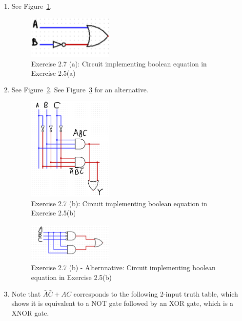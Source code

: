 \documentclass[12pt]{article}
\newenvironment{sol}[1][Solution]{\begin{trivlist}
		\item[\hskip \labelsep {\bfseries #1:}]}{\end{trivlist}}
\begin{document}
\begin{sol}
	\begin{enumerate}[label=(\alph*)]
		\item See Figure~\ref{02-07a}.
		\begin{figure}
			\centering
			\includegraphics[width=0.4\textwidth]{02-07a-circuit}
			\caption{Exercise 2.7 (a): Circuit implementing boolean equation in Exercise 2.5(a)}
			\label{02-07a}
		\end{figure}
		\item See Figure~\ref{02-07b}. See Figure~\ref{02-07b-alt} for an alternative.
		\begin{figure}
			\centering
			\includegraphics[width=0.4\textwidth]{02-07b-circuit}
			\caption{Exercise 2.7 (b): Circuit implementing boolean equation in Exercise 2.5(b)}
			\label{02-07b}
		\end{figure}
		\begin{figure}
			\centering
			\includegraphics[width=0.4\textwidth]{02-07b-circuit-alternate}
			\caption{Exercise 2.7 (b) - Alternnative: Circuit implementing boolean equation in Exercise 2.5(b)}
			\label{02-07b-alt}
		\end{figure}
		\item Note that $\bar{A}\bar{C}+AC$ corresponds to the following 2-input truth table, which shows it is equivalent to a NOT gate followed by an XOR gate, which is a XNOR gate.

\end{enumerate}
\end{sol}
\end{document}

